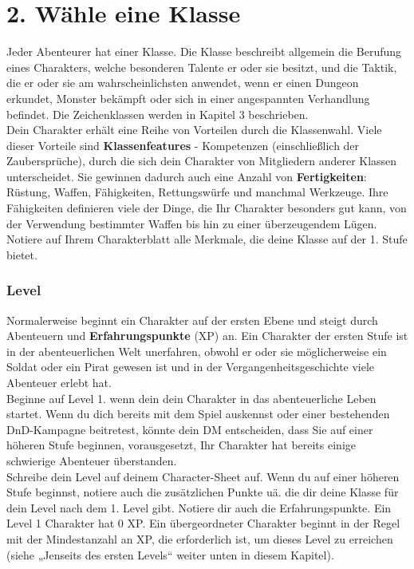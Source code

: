 \section{2. Wähle eine Klasse}
Jeder Abenteurer hat einer Klasse. Die Klasse beschreibt allgemein die Berufung eines Charakters, welche besonderen Talente er oder sie besitzt, und die Taktik, die er oder sie am wahrscheinlichsten anwendet, wenn er einen Dungeon erkundet, Monster bekämpft oder sich in einer angespannten Verhandlung befindet. Die Zeichenklassen werden in Kapitel 3 beschrieben.\\
Dein Charakter erhält eine Reihe von Vorteilen durch die Klassenwahl. Viele dieser Vorteile sind \textbf{Klassenfeatures} - Kompetenzen (einschließlich der Zaubersprüche), durch die sich dein Charakter von Mitgliedern anderer Klassen unterscheidet. Sie gewinnen dadurch auch eine Anzahl von \textbf{Fertigkeiten}: Rüstung, Waffen, Fähigkeiten, Rettungswürfe und manchmal Werkzeuge. Ihre Fähigkeiten definieren viele der Dinge, die Ihr Charakter besonders gut kann, von der Verwendung bestimmter Waffen bis hin zu einer überzeugendem Lügen.\\
Notiere auf Ihrem Charakterblatt alle Merkmale, die deine Klasse auf der 1. Stufe bietet.
\subsubsection{Level}

Normalerweise beginnt ein Charakter auf der ersten Ebene und steigt durch Abenteuern und \textbf{Erfahrungspunkte} (XP) an. Ein Charakter der ersten Stufe ist in der abenteuerlichen Welt unerfahren, obwohl er oder sie möglicherweise ein Soldat oder ein Pirat gewesen ist und in der Vergangenheitsgeschichte viele Abenteuer erlebt hat.\\
Beginne auf Level 1. wenn dein dein Charakter in das abenteuerliche Leben startet. Wenn du dich bereits mit dem Spiel auskennst oder einer bestehenden DnD-Kampagne beitretest, könnte dein DM entscheiden, dass Sie auf einer höheren Stufe beginnen, vorausgesetzt, Ihr Charakter hat bereits einige schwierige Abenteuer überstanden.\\
Schreibe dein Level auf deinem Character-Sheet auf. Wenn du auf einer höheren Stufe beginnst, notiere auch die zusätzlichen Punkte uä. die dir deine Klasse für dein Level nach dem 1. Level gibt. Notiere dir auch die Erfahrungspunkte. Ein Level 1 Charakter hat 0 XP. Ein übergeordneter Charakter beginnt in der Regel mit der Mindestanzahl an XP, die erforderlich ist, um dieses Level zu erreichen (siehe „Jenseits des ersten Levels“ weiter unten in diesem Kapitel).

